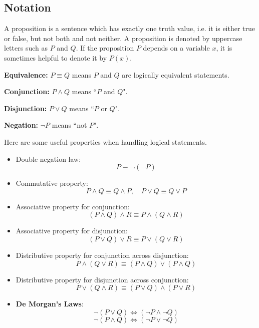 \subsection{Notation}
A proposition is a sentence which has exactly one truth value, i.e. it is either true or false, but not both and not neither. A proposition is denoted by uppercase letters such as $P$ and $Q$. If the proposition $P$ depends on a variable $x$, it is sometimes helpful to denote it by $P(x)$. 

\textbf{Equivalence:} $P \equiv Q$ means $P$ and $Q$ are logically equivalent statements.

\textbf{Conjunction:} $P \land Q$ means ``$P$ and $Q$".

\textbf{Disjunction:} $P \lor Q$ means ``$P$ or $Q$".

\textbf{Negation:} $\lnot P$ means ``not $P$".

Here are some useful properties when handling logical statements.
\begin{itemize}
\item Double negation law:
\[ P \equiv \lnot(\lnot P) \]

\item Commutative property:
\[ P \land Q \equiv Q \land P, \quad P \lor Q \equiv Q \lor P \]

\item Associative property for conjunction: 
\[ (P\land Q)\land R \equiv P\land (Q\land R) \]

\item Associative property for disjunction: 
\[ (P\lor Q)\lor R \equiv P\lor (Q\lor R) \]

\item Distributive property for conjunction across disjunction: 
\[ P\land(Q\lor R) \equiv (P\land Q)\lor(P\land Q) \]

\item Distributive property for disjunction across conjunction: 
\[ P\lor(Q\land R) \equiv (P\lor Q)\land(P\lor R) \]

\item \textbf{De Morgan's Laws}:
\[ \lnot(P \lor Q) \iff (\lnot P \land \lnot Q) \]
\[ \lnot (P\land Q) \iff (\lnot P\lor \lnot Q) \]
\end{itemize}

